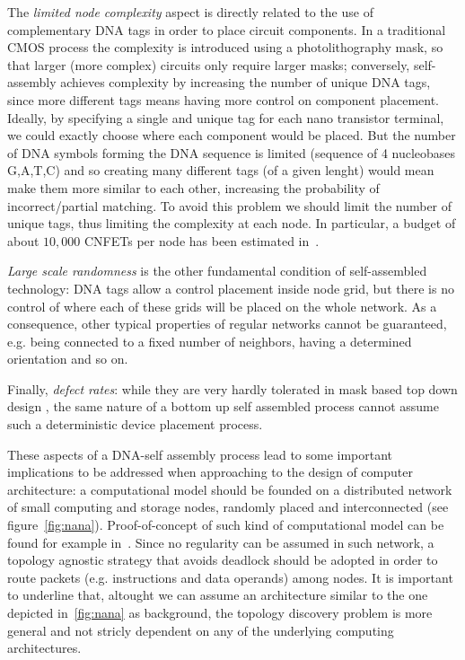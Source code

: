 The \emph{limited node complexity} aspect is directly
related to the use of complementary DNA tags in order to place circuit
components. In a traditional CMOS process the complexity is introduced
using a photolithography mask, so that larger (more complex) circuits
only require larger masks; conversely, self-assembly achieves
complexity by increasing the number of unique DNA tags, since more
different tags means having more control on component placement. Ideally, by specifying a single
and unique tag for each nano transistor terminal, we could exactly
choose where each component would be placed. But the number of DNA
symbols forming the DNA sequence is limited (sequence of 4 nucleobases
G,A,T,C) and so creating many different tags (of a given lenght) would
mean make them more similar to each other, increasing the probability
of incorrect/partial matching. To avoid this problem we should limit
the number of unique tags, thus limiting the complexity at each node.
In particular, a budget of about $10,000$ CNFETs per node has been
estimated in~\cite{liu_jetcs}.

\emph{Large scale randomness} is the other fundamental condition of
self-assembled technology: DNA tags allow a control placement inside
node grid, but there is no control of where each of these  grids will
be placed on the whole network. As a consequence, other typical
properties of regular networks cannot be guaranteed, e.g. being
connected to a fixed number of neighbors, having a determined
orientation and so on.

Finally, \emph{defect rates}: while they are very hardly tolerated in mask
based top down design , the same nature of a bottom up self
assembled process cannot assume such a deterministic device placement
process.

These aspects of a DNA-self assembly process lead to some important
implications to be addressed when approaching to the design of
computer architecture: a computational model should be founded on a
distributed network of small computing and storage nodes, randomly
placed and interconnected (see figure~\ref{fig:nana}).
Proof-of-concept of such kind of computational model can be found for
example in~\cite{patwardhan2006_1}.  Since no regularity can be
assumed in such network, a topology agnostic strategy that avoids
deadlock should be adopted in order to route packets (e.g.
instructions and data operands) among nodes.  It is important to
underline that, altought we can assume an architecture similar to the
one depicted in~\ref{fig:nana} as background, the topology discovery
problem is more general and not stricly dependent on any of the
underlying computing architectures.

